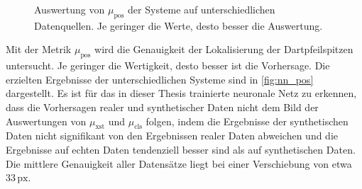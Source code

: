 \begin{figure}
    \centering
    \caption{Auswertung von $\mu_\text{pos}$ der Systeme auf unterschiedlichen Datenquellen. Je geringer die Werte, desto besser die Auswertung.}
    \label{fig:nn_pos}
\end{figure}

Mit der Metrik $\mu_\text{pos}$ wird die Genauigkeit der Lokalisierung der Dartpfeilspitzen untersucht. Je geringer die Wertigkeit, desto besser ist die Vorhersage. Die erzielten Ergebnisse der unterschiedlichen Systeme sind in \autoref{fig:nn_pos} dargestellt. Es ist für das in dieser Thesis trainierte neuronale Netz zu erkennen, dass die Vorhersagen realer und synthetischer Daten nicht dem Bild der Auswertungen von $\mu_\text{xst}$ und $\mu_\text{cls}$ folgen, indem die Ergebnisse der synthetischen Daten nicht signifikant von den Ergebnissen realer Daten abweichen und die Ergebnisse auf echten Daten tendenziell besser sind als auf synthetischen Daten. Die mittlere Genauigkeit aller Datensätze liegt bei einer Verschiebung von etwa $33\,\text{px}$.

